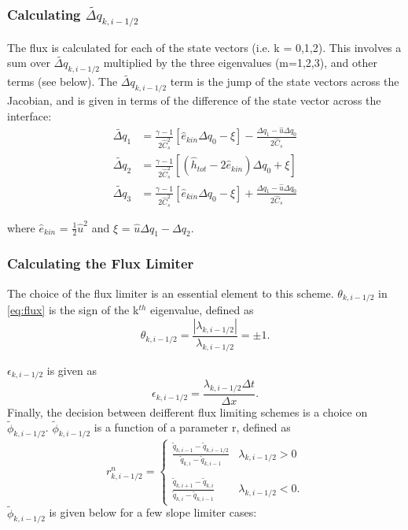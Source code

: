 \documentclass{article}
\begin{document}
\subsubsection{Calculating $\tilde{\Delta q}_{k,i-1/2}$}
The flux is calculated for each of the state vectors (i.e. k = 0,1,2). This involves
a sum over $\tilde{\Delta q}_{k,i-1/2}$ multiplied by the three eigenvalues (m=1,2,3),
and other terms (see below). The $\tilde{\Delta q}_{k,i-1/2}$ term is the jump
of the state vectors across the Jacobian, and is given in terms of the difference of the state
vector across the interface:
\begin{align}
\label{eq:deltaq1}
\tilde{\Delta q}_1 &= \frac{\gamma - 1}{2\hat{C}^2_s}
                                \left[\hat{e}_{kin} \Delta q_0 - \xi \right]
                                - \frac{\Delta q_1 - \hat{u} \Delta q_0}{2\hat{C}_s}\\
\label{eq:deltaq2}
\tilde{\Delta q}_2 &= \frac{\gamma - 1}{2\hat{C}^2_s}
                                \left[\left(\hat{h}_{tot} - 2\hat{e}_{kin}\right)
                                      \Delta q_0 + \xi \right] \\
\label{eq:deltaq3}
\tilde{\Delta q}_3 &= \frac{\gamma - 1}{2\hat{C}^2_s}
                                \left[\hat{e}_{kin} \Delta q_0 - \xi \right]
                                + \frac{\Delta q_1 - \hat{u} \Delta q_0}{2\hat{C}_s}
\end{align}

where $\hat{e}_{kin}$ = $\frac{1}{2} \hat{u}^2$ and 
$\xi$ = $\hat{u}\Delta q_1 - \Delta q_2$. 

\subsubsection{Calculating the Flux Limiter}
The choice of the flux limiter is an essential element to this scheme.
$\theta_{k,i-1/2}$ in \eqref{eq:flux} is the sign of the k$^{th}$ 
eigenvalue, defined as
\begin{equation}
\theta_{k,i-1/2} = \frac{| \lambda_{k,i-1/2}|}{\lambda_{k,i-1/2}} = \pm 1.
\end{equation}

$\epsilon_{k,i-1/2}$ is given as
\begin{equation}
\epsilon_{k,i-1/2} = \frac{\lambda_{k,i-1/2} \Delta t}{\Delta x}.
\end{equation}
Finally, the decision between deifferent flux limiting schemes is a choice
on $\tilde{\phi}_{k,i-1/2}$. $\tilde{\phi}_{k,i-1/2}$ is a function
of a parameter r, defined as
\[
r^{n}_{k,i-1/2} =
    \begin{cases}
    \frac{\tilde{q}_{k,i-1} - \tilde{q}_{k,i-1/2}}
         {\tilde{q}_{k,i} - \tilde{q}_{k,i-1}}
         &\lambda_{k,i-1/2} > 0 \\

    \\
    \frac{\tilde{q}_{k,i+1} - \tilde{q}_{k,i}}
         {\tilde{q}_{k,i} - \tilde{q}_{k,i-1}} 
         &\lambda_{k,i-1/2} < 0.
    \end{cases}
\]
$\tilde{\phi}_{k,i-1/2}$ is given below for a few slope limiter cases:
\end{document}
